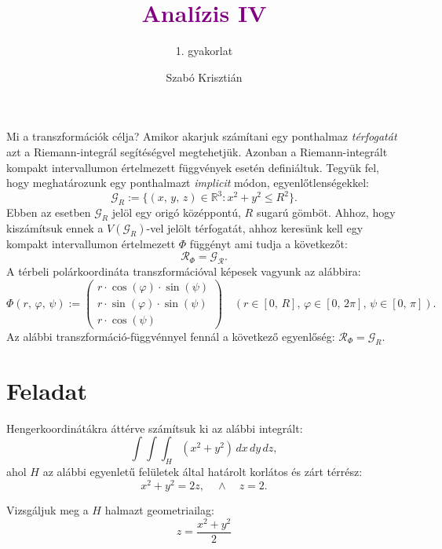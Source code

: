 \documentclass[12pt]{article}
\title{\textcolor{purple}{\Huge\textbf{Analízis IV}}}
\author{1. gyakorlat}
\date{Szabó Krisztián}
\newcommand{\R}{\mathbb{R}}
\begin{document}
    \maketitle
    \tableofcontents
    \newpage

    Mi a transzformációk célja? Amikor akarjuk számítani egy ponthalmaz \textit{térfogatát} azt a Riemann-integrál segítéségvel megtehetjük. Azonban a Riemann-integrált kompakt intervallumon értelmezett függvények esetén definiáltuk. Tegyük fel, hogy meghatározunk egy ponthalmazt \textit{implicit} módon, egyenlőtlenségekkel:
    \[
        \mathcal{G}_R := \{ (x, \, y, \, z) \in \R^3 : x^2 + y^2 \leq R^2 \}.
    \]
    Ebben az esetben $\mathcal{G}_R$ jelöl egy origó középpontú, $R$ sugarú gömböt. Ahhoz, hogy kiszámítsuk ennek a $V(\mathcal{G}_R)$-vel jelölt térfogatát, ahhoz keresünk kell egy kompakt intervallumon értelmezett $\Phi$ függényt ami tudja a következőt:
    \[
        \mathcal{R}_\Phi = \mathcal{G_R}.
    \]
    A térbeli polárkoordináta transzformációval képesek vagyunk az alábbira:
    \[
        \Phi(r, \, \varphi, \, \psi) :=
        \begin{pmatrix}
            r \cdot \cos(\varphi) \cdot \sin(\psi) \\
            r \cdot \sin(\varphi) \cdot \sin(\psi) \\
            r \cdot \cos(\psi)
        \end{pmatrix}
        \quad (r \in [0, \, R], \, \varphi \in [0, \, 2 \pi], \, \psi \in [0, \, \pi]).
    \]
    Az alábbi transzformáció-függvénnyel fennál a következő egyenlőség: $\mathcal{R}_\Phi = \mathcal{G}_R$.

    \section{Feladat}
    Hengerkoordinátákra áttérve számítsuk ki az alábbi integrált:
    \[
        \int\int\int_H (x^2 + y^2) \, dx \, dy \, dz,
    \]
    ahol $H$ az alábbi egyenletű felületek által határolt korlátos és zárt térrész:
    \[
        x^2 + y^2 = 2z, \quad \wedge \quad z = 2.
    \]

    Vizsgáljuk meg a $H$ halmazt geometriailag:
    \[
        z = \frac{x^2 + y^2}{2}
    \]
\end{document}
